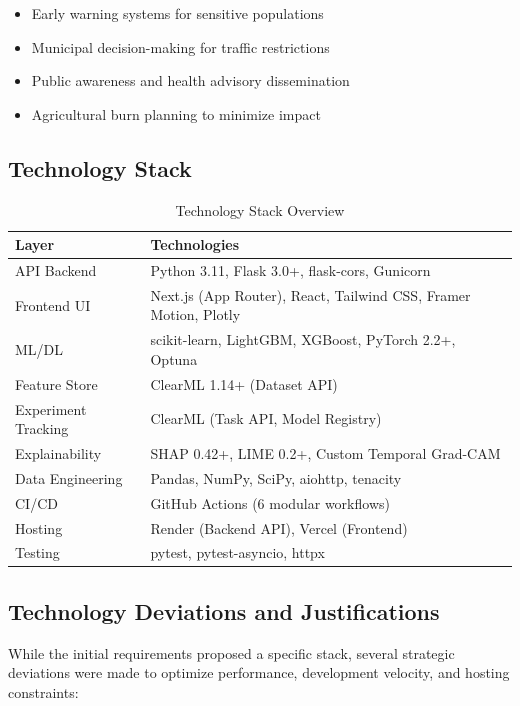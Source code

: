 \documentclass[12pt, a4paper, oneside]{article}
\begin{document}
\begin{itemize}
    \item Early warning systems for sensitive populations
    \item Municipal decision-making for traffic restrictions
    \item Public awareness and health advisory dissemination
    \item Agricultural burn planning to minimize impact
\end{itemize}

\subsection{Technology Stack}

\begin{table}[H]
\centering
\caption{Technology Stack Overview}
\label{tab:techstack}
\begin{tabularx}{\textwidth}{l X}
\toprule
\textbf{Layer} & \textbf{Technologies} \\
\midrule
API Backend & Python 3.11, Flask 3.0+, flask-cors, Gunicorn \\
Frontend UI & Next.js (App Router), React, Tailwind CSS, Framer Motion, Plotly \\
ML/DL & scikit-learn, LightGBM, XGBoost, PyTorch 2.2+, Optuna \\
Feature Store & ClearML 1.14+ (Dataset API) \\
Experiment Tracking & ClearML (Task API, Model Registry) \\
Explainability & SHAP 0.42+, LIME 0.2+, Custom Temporal Grad-CAM \\
Data Engineering & Pandas, NumPy, SciPy, aiohttp, tenacity \\
CI/CD & GitHub Actions (6 modular workflows) \\
Hosting & Render (Backend API), Vercel (Frontend) \\
Testing & pytest, pytest-asyncio, httpx \\
\bottomrule
\end{tabularx}
\end{table}

\subsection{Technology Deviations and Justifications}

While the initial requirements proposed a specific stack, several strategic deviations were made to optimize performance, development velocity, and hosting constraints:
\end{document}
